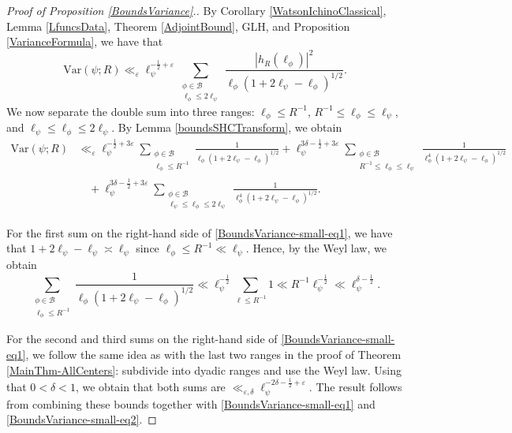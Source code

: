 \documentclass[11pt]{amsart}
\theoremstyle{definition}
\begin{document}
\begin{proof}[Proof of Proposition \ref{BoundsVariance}.]
By Corollary \ref{WatsonIchinoClassical}, Lemma \ref{LfuncsData}, Theorem \ref{AdjointBound}, GLH, and Proposition \ref{VarianceFormula}, we have that $$\mathrm{Var}(\psi;R) \ll_{\varepsilon} \ell_{\psi}^{-\frac{1}{2}+\varepsilon} \sum_{\substack{\phi \in \mathcal{B} \\ \ell_{\phi} \leq 2\ell_{\psi}}} \frac{|h_R(\ell_{\phi})|^2}{\ell_{\phi} (1+2\ell_{\psi} - \ell_{\phi})^{1/2}}.$$ We now separate the double sum into three ranges: $\ell_{\phi} \leq R^{-1}$, $R^{-1} \leq \ell_{\phi} \leq \ell_{\psi}$, and $\ell_{\psi} \leq \ell_{\phi} \leq 2\ell_{\psi}$. By Lemma \ref{boundsSHCTransform}, we obtain
\begin{align}
    \mathrm{Var}(\psi;R) &\ll_{\varepsilon} \ell_{\psi}^{-\frac{1}{2}+3\varepsilon} \sum_{\substack{\phi \in \mathcal{B} \\ \ell_{\phi} \leq R^{-1}}} \frac{1}{\ell_{\phi} (1+2\ell_{\psi} - \ell_{\phi})^{1/2}} + \ell_{\psi}^{3\delta-\frac{1}{2}+3\varepsilon} \sum_{\substack{\phi \in \mathcal{B} \\ R^{-1} \leq \ell_{\phi} \leq \ell_{\psi}}} \frac{1}{\ell_{\phi}^{4} (1+2\ell_{\psi} - \ell_{\phi})^{1/2}} \label{BoundsVariance-small-eq1} \\
    &\quad + \ell_{\psi}^{3\delta-\frac{1}{2}+3\varepsilon} \sum_{\substack{\phi \in \mathcal{B} \\ \ell_{\psi} \leq \ell_{\phi} \leq 2\ell_{\psi}}} \frac{1}{\ell_{\phi}^{4} (1+2\ell_{\psi} - \ell_{\phi})^{1/2}}. \nonumber
\end{align}

For the first sum on the right-hand side of \eqref{BoundsVariance-small-eq1}, we have that $1+2\ell_{\psi} - \ell_{\psi} \asymp \ell_{\psi}$ since $\ell_{\phi} \leq R^{-1} \ll \ell_{\psi}$. Hence, by the Weyl law, we obtain 
\begin{equation}
    \sum_{\substack{\phi \in \mathcal{B} \\ \ell_{\phi} \leq R^{-1}}} \frac{1}{\ell_{\phi} (1+2\ell_{\psi} - \ell_{\phi})^{1/2}} \ll \ell_{\psi}^{-\frac{1}{2}} \sum_{\ell \leq R^{-1}} 1 \ll R^{-1} \ell_{\psi}^{-\frac{1}{2}} \ll \ell_{\psi}^{\delta - \frac{1}{2}}. \label{BoundsVariance-small-eq2}
\end{equation}

For the second and third sums on the right-hand side of \eqref{BoundsVariance-small-eq1}, we follow the same idea as with the last two ranges in the proof of Theorem \ref{MainThm-AllCenters}: subdivide into dyadic ranges and use the Weyl law. Using that $0<\delta<1$, we obtain that both sums are $\ll_{\varepsilon, \delta} \ell_{\psi}^{-2\delta - \frac{1}{2}+\varepsilon}$. The result follows from combining these bounds together with \eqref{BoundsVariance-small-eq1} and \eqref{BoundsVariance-small-eq2}.
\end{proof}











\end{document}
